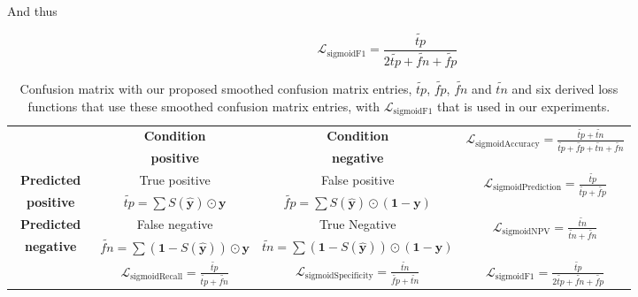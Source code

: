 And thus

\begin{equation}
\mathcal{L}_{\text {sigmoidF1}}= \frac{\widetilde{\mathit{tp}}}{2 \widetilde{\mathit{tp}}+ \widetilde{\mathit{fn}}+ \widetilde{\mathit{fp}}}
\end{equation}

 \cite{smoothHinge}

\begin{table}[]
\caption{Confusion matrix with our proposed smoothed confusion matrix entries, $\widetilde{\mathit{tp}}$, $\widetilde{\mathit{fp}}$, $\widetilde{\mathit{fn}}$ and $\widetilde{\mathit{tn}}$ and six derived loss functions that use these smoothed confusion matrix entries, with $\mathcal{L}_{\text {sigmoidF1}}$ that is used in our experiments.}
\def\arraystretch{1.1}
\begin{tabular}{|c||c|c||c|} \cline{2-4}
\multicolumn{1}{l|}{} & \textbf{Condition} & \textbf{Condition} & \multirow{2}{*}{$\mathcal{L}_{\text {sigmoidAccuracy}}= \frac{\widetilde{\mathit{tp}} + \widetilde{\mathit{tn}}}{\widetilde{\mathit{tp}} + \widetilde{\mathit{fp}} + \widetilde{\mathit{tn}} + \widetilde{\mathit{fn}}}$} \\
\multicolumn{1}{l|}{} & \textbf{positive} &  \textbf{negative} & \\ \hline \hline
\textbf{~Predicted~} & True positive & False positive & \multirow{2}{*}{$\mathcal{L}_{\text {sigmoidPrediction}}= \frac{\widetilde{\mathit{tp}}}{\widetilde{\mathit{tp}} + \widetilde{\mathit{fp}}}$} \\
\textbf{positive} & $\widetilde{\mathit{tp}}=\sum S(\hat{\mathbf{y}}) \odot \mathbf{y}$ & $\widetilde{\mathit{fp}}= \sum S(\hat{\mathbf{y}}) \odot (\mathbf{1} - \mathbf{y})$ & \\ \hline
\textbf{Predicted} & False negative & True Negative & \multirow{2}{*}{$\mathcal{L}_{\text {sigmoidNPV}}= \frac{\widetilde{\mathit{tn}}}{\widetilde{\mathit{tn}} + \widetilde{\mathit{fn}}}$} \\
\textbf{negative} & $\widetilde{\mathit{fn}}= \sum (\mathbf{1} - S(\hat{\mathbf{y}})) \odot \mathbf{y}$ & $\widetilde{\mathit{tn}}= \sum (\mathbf{1} - S(\hat{\mathbf{y}})) \odot (\mathbf{1} - \mathbf{y})$ & \\ \hline \hline
\multicolumn{1}{l|}{} & \multirow{2}{*}{\hspace{1.2em}$\mathcal{L}_{\text {sigmoidRecall}}= \frac{\widetilde{\mathit{tp}}}{\widetilde{\mathit{tp}} + \widetilde{\mathit{fn}}}$\hspace{1.2em}}& \multirow{2}{*}{$\mathcal{L}_{\text {sigmoidSpecificity}}= \frac{\widetilde{\mathit{tn}}}{\widetilde{\mathit{fp}} + \widetilde{\mathit{tn}}}$} & \multirow{2}{*}{$\mathcal{L}_{\text {sigmoidF1}}= \frac{\widetilde{\mathit{tp}}}{2 \widetilde{\mathit{tp}}+ \widetilde{\mathit{fn}}+ \widetilde{\mathit{fp}}}$} \\
\multicolumn{1}{l|}{} & & & \\
\cline{2-4}
\end{tabular}%
\label{tab:my-table}
\end{table}

